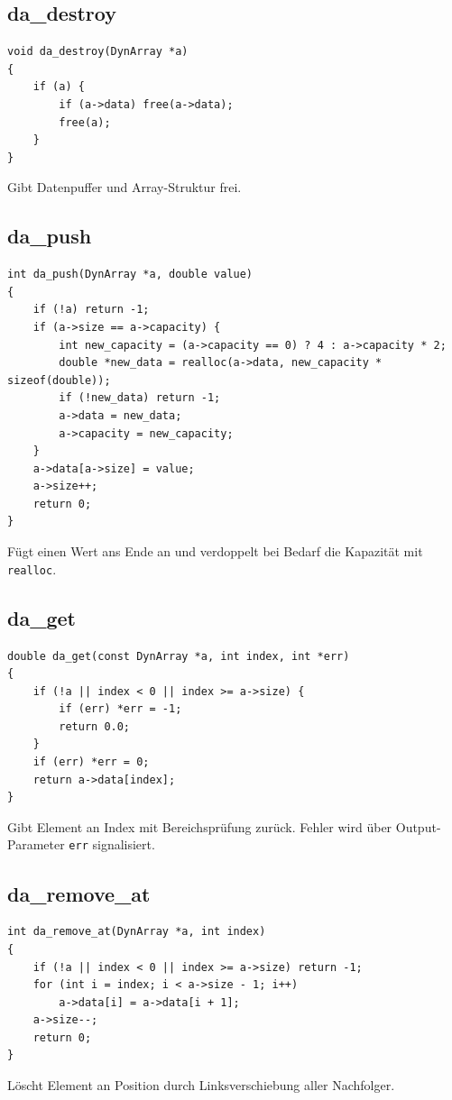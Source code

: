 \documentclass[10pt, a4paper]{article}
\begin{document}
\subsection{da\_destroy}
\begin{lstlisting}
void da_destroy(DynArray *a)
{
    if (a) {
        if (a->data) free(a->data);
        free(a);
    }
}
\end{lstlisting}
Gibt Datenpuffer und Array-Struktur frei.

\subsection{da\_push}
\begin{lstlisting}
int da_push(DynArray *a, double value)
{
    if (!a) return -1;
    if (a->size == a->capacity) {
        int new_capacity = (a->capacity == 0) ? 4 : a->capacity * 2;
        double *new_data = realloc(a->data, new_capacity * sizeof(double));
        if (!new_data) return -1;
        a->data = new_data;
        a->capacity = new_capacity;
    }
    a->data[a->size] = value;
    a->size++;
    return 0;
}
\end{lstlisting}
F\"ugt einen Wert ans Ende an und verdoppelt bei Bedarf die Kapazit\"at mit \texttt{realloc}.

\subsection{da\_get}
\begin{lstlisting}
double da_get(const DynArray *a, int index, int *err)
{
    if (!a || index < 0 || index >= a->size) {
        if (err) *err = -1;
        return 0.0;
    }
    if (err) *err = 0;
    return a->data[index];
}
\end{lstlisting}
Gibt Element an Index mit Bereichspr\"ufung zur\"uck. Fehler wird \"uber Output-Parameter \texttt{err} signalisiert.

\subsection{da\_remove\_at}
\begin{lstlisting}
int da_remove_at(DynArray *a, int index)
{
    if (!a || index < 0 || index >= a->size) return -1;
    for (int i = index; i < a->size - 1; i++)
        a->data[i] = a->data[i + 1];
    a->size--;
    return 0;
}
\end{lstlisting}
L\"oscht Element an Position durch Linksverschiebung aller Nachfolger.
\end{document}
